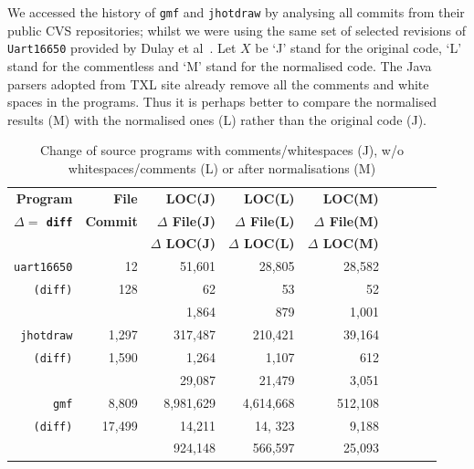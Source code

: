 \documentclass[10pt, conference, compsocconf]{IEEEtran}
\begin{document}
{We accessed the history of {\tt gmf} and {\tt jhotdraw} by analysing all commits from their public CVS repositories; whilst we were using the same set of selected revisions of {\tt Uart16650} provided by Dulay et al~\cite{Duley:2010:PDA:1858996.1859093}. 
Let $X$ be `J' stand for the original code, `L' stand for the commentless and `M' stand for the normalised code. 
The Java parsers adopted from TXL site already remove all the comments and white spaces in the programs.  Thus it is perhaps better to compare the normalised results (M) with the normalised ones (L) rather than the original code (J).

\begin{table}\centering
\caption{Change of source programs with comments/whitespaces (J), w/o whitespaces/comments  (L) or after normalisations (M)\label{table:3}}
\begin{tabular}{| r || r || r | r | r || r | r| r|  r || }\hline
\bf \tiny Program & \bf  \tiny  File & \bf   \tiny  LOC(J) & \bf  \tiny  LOC(L) & \bf  \tiny  LOC(M) \\
\bf \tiny $\Delta=$ {\tt diff} & \bf  \tiny  Commit & \bf  \tiny  $\Delta$ File(J)  & \bf  \tiny $\Delta$ File(L) & \bf  \tiny  $\Delta$ File(M) \\  
             & \bf  \tiny  & \bf  \tiny  $\Delta$ LOC(J) & \bf  \tiny  $\Delta$ LOC(L) & \bf  \tiny  $\Delta$ LOC(M) \\  
\hline\hline
{\tt uart16650} & 12 & 51,601 & 28,805 & 28,582 \\
{\tt (diff)}  & 128 & 62 & 53 & 52\\
                & &1,864 & 879 & 1,001 \\
\hline
{\tt jhotdraw} & 1,297 & 317,487& 210,421 & 39,164 \\ 
{\tt (diff)} & 1,590 &1,264 & 1,107 & 612  \\
& & 29,087 	& 21,479 & 3,051 \\
\hline
{\tt gmf} & 8,809 &  8,981,629 & 4,614,668& 512,108\\
{\tt (diff)} &17,499 & 14,211 &  14, 323& 9,188 \\
  & &  924,148 & 566,597& 25,093 \\
\hline
\hline\end{tabular}
\end{table}

}
\end{document}
